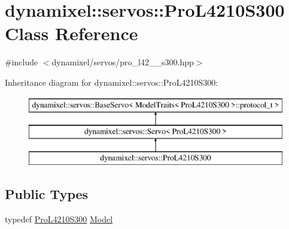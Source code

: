 \hypertarget{classdynamixel_1_1servos_1_1_pro_l4210_s300}{}\section{dynamixel\+:\+:servos\+:\+:Pro\+L4210\+S300 Class Reference}
\label{classdynamixel_1_1servos_1_1_pro_l4210_s300}


{\ttfamily \#include $<$dynamixel/servos/pro\+\_\+l42\+\_\+\_\+s300.\+hpp$>$}

Inheritance diagram for dynamixel\+:\+:servos\+:\+:Pro\+L4210\+S300\+:\begin{figure}[H]
\begin{center}
\leavevmode
\includegraphics[height=3.000000cm]{classdynamixel_1_1servos_1_1_pro_l4210_s300}
\end{center}
\end{figure}
\subsection*{Public Types}
\begin{DoxyCompactItemize}
\item 
typedef \hyperlink{classdynamixel_1_1servos_1_1_pro_l4210_s300}{Pro\+L4210\+S300} \hyperlink{classdynamixel_1_1servos_1_1_pro_l4210_s300_a1b4b259aea6c0b456ca339f0268ec843}{Model}
\end{DoxyCompactItemize}
